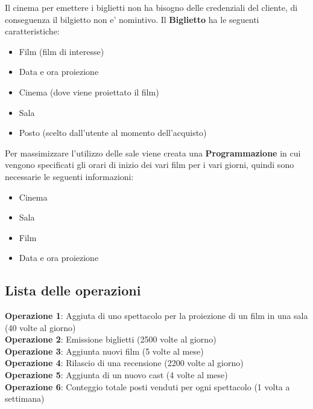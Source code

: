 \documentclass[10pt]{article}
\begin{document}
	Il cinema per emettere i biglietti non ha bisogno delle credenziali del cliente, di conseguenza il bilgietto non e' nomintivo. Il {\bf Biglietto} ha le seguenti caratteristiche:
	\begin{itemize}	
		\item Film (film di interesse)
		\item Data e ora proiezione
		\item Cinema (dove viene proiettato il film)
		\item Sala
		\item Posto (scelto dall'utente al momento dell'acquisto)
	\end{itemize}
 	Per massimizzare l'utilizzo delle sale viene creata una \textbf{Programmazione} in cui vengono specificati gli orari di inizio dei vari film per i vari giorni, quindi sono necessarie le seguenti informazioni:
 	\begin{itemize}
 		\item Cinema
 		\item Sala
 		\item Film
 		\item Data e ora proiezione
 	\end{itemize} 
 	\subsection{Lista delle operazioni}		
	\textbf{Operazione 1}: Aggiuta di uno spettacolo per la proiezione di un film in una sala (40 volte al giorno) \\
	\textbf{Operazione 2}: Emissione biglietti (2500 volte al giorno)\\
	\textbf{Operazione 3}: Aggiunta nuovi film (5 volte al mese)\\
	\textbf{Operazione 4}: Rilascio di una recensione (2200 volte al giorno)\\
	\textbf{Operazione 5}: Aggiunta di un nuovo cast (4 volte al mese)\\
	\textbf{Operazione 6}: Conteggio totale posti venduti per ogni spettacolo (1 volta a settimana)
\end{document}
